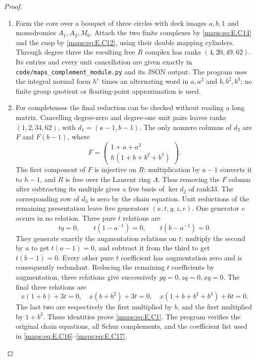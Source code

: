 \begin{proof}
\begin{enumerate}[label=\arabic*.,leftmargin=*]
\item Form the core over a bouquet of three circles with
deck images $a,b,1$ and monodromies $A_1,A_2,M_0$.
Attach the two finite complexes by \eqref{maps:eq:E.C14} and the
cusp by \eqref{maps:eq:E.C12}, using their double mapping cylinders.
Through degree three the resulting free $R$ complex
has ranks $(4,20,49,62)$. Its entries and every unit
cancellation are given exactly in
\texttt{code/maps\_complement\_module.py} and its
JSON output. The program uses the integral normal
form $h^r$ times an alternating word in
$a,a^2$ and $b,b^2,b^3$; no finite group quotient or
floating-point approximation is used.

\item For completeness the final reduction can be checked
without reading a long matrix. Cancelling degree-zero
and degree-one unit pairs leaves ranks $(1,2,34,62)$,
with $d_1=(a-1,b-1)$. The only nonzero columns of
$d_2$ are $F$ and $F(b-1)$, where
\[
 F=\begin{pmatrix}1+a+a^2\\h(1+b+b^2+b^3)\end{pmatrix}.
 \tag{E.C15}\label{maps:eq:E.C15}
\]
The first component of $F$ is injective on $R$:
multiplication by $a-1$ converts it to $h-1$, and
$R$ is free over the Laurent ring $A$. Thus removing
the $F$ column after subtracting its multiple gives
a free basis of $\ker d_2$ of rank33. The corresponding
row of $d_3$ is zero by the chain equation. Unit
reductions of the remaining presentation leave five
generators $(x,t,y,z,e)$. One generator $e$ occurs
in no relation. Three pure $t$ relations are
\[
 tq=0,\qquad t(1-a^{-1})=0,
                  \qquad t(b-a^{-1})=0.
 \tag{E.C16}\label{maps:eq:E.C16}
\]
They generate exactly the augmentation relations on
$t$: multiply the second by $a$ to get $t(a-1)=0$,
and subtract it from the third to get $t(b-1)=0$.
Every other pure $t$ coefficient has augmentation
zero and is consequently redundant. Reducing the
remaining $t$ coefficients by augmentation, three
relations give successively $yq=0,zq=0,xq=0$.
The final three relations are
\[
 x(1+b)+3t=0,\quad x(b+b^2)+3t=0,
                   \quad x(1+b+b^2+b^3)+6t=0.
 \tag{E.C17}\label{maps:eq:E.C17}
\]
The last two are respectively the first multiplied
by $b$, and the first multiplied by $1+b^2$.
These identities prove \eqref{maps:eq:E.C1}. The program verifies
the original chain equations, all Schur complements,
and the coefficient list used in \eqref{maps:eq:E.C16}--\eqref{maps:eq:E.C17}.


\end{enumerate}
\end{proof}

